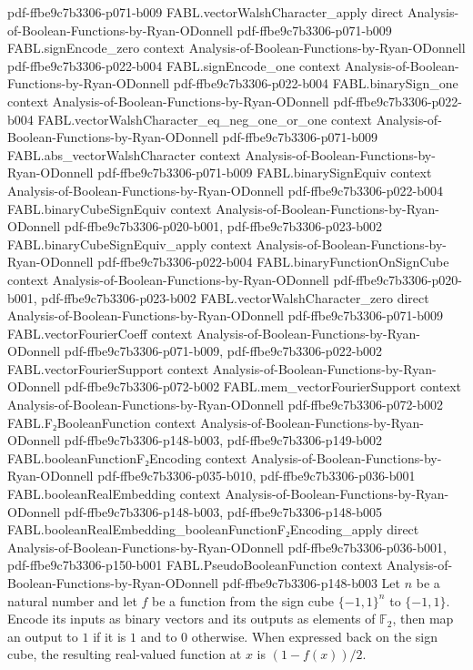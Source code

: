 \begin{theorem}
  {pdf-ffbe9c7b3306-p071-b009}
\proofstep
  {FABL.vectorWalshCharacter_apply}
  {direct}
  {Analysis-of-Boolean-Functions-by-Ryan-ODonnell}
  {pdf-ffbe9c7b3306-p071-b009}
\proofstep
  {FABL.signEncode_zero}
  {context}
  {Analysis-of-Boolean-Functions-by-Ryan-ODonnell}
  {pdf-ffbe9c7b3306-p022-b004}
\proofstep
  {FABL.signEncode_one}
  {context}
  {Analysis-of-Boolean-Functions-by-Ryan-ODonnell}
  {pdf-ffbe9c7b3306-p022-b004}
\proofstep
  {FABL.binarySign_one}
  {context}
  {Analysis-of-Boolean-Functions-by-Ryan-ODonnell}
  {pdf-ffbe9c7b3306-p022-b004}
\proofstep
  {FABL.vectorWalshCharacter_eq_neg_one_or_one}
  {context}
  {Analysis-of-Boolean-Functions-by-Ryan-ODonnell}
  {pdf-ffbe9c7b3306-p071-b009}
\proofstep
  {FABL.abs_vectorWalshCharacter}
  {context}
  {Analysis-of-Boolean-Functions-by-Ryan-ODonnell}
  {pdf-ffbe9c7b3306-p071-b009}
\proofstep
  {FABL.binarySignEquiv}
  {context}
  {Analysis-of-Boolean-Functions-by-Ryan-ODonnell}
  {pdf-ffbe9c7b3306-p022-b004}
\proofstep
  {FABL.binaryCubeSignEquiv}
  {context}
  {Analysis-of-Boolean-Functions-by-Ryan-ODonnell}
  {pdf-ffbe9c7b3306-p020-b001,
    pdf-ffbe9c7b3306-p023-b002}
\proofstep
  {FABL.binaryCubeSignEquiv_apply}
  {context}
  {Analysis-of-Boolean-Functions-by-Ryan-ODonnell}
  {pdf-ffbe9c7b3306-p022-b004}
\proofstep
  {FABL.binaryFunctionOnSignCube}
  {context}
  {Analysis-of-Boolean-Functions-by-Ryan-ODonnell}
  {pdf-ffbe9c7b3306-p020-b001,
    pdf-ffbe9c7b3306-p023-b002}
\proofstep
  {FABL.vectorWalshCharacter_zero}
  {direct}
  {Analysis-of-Boolean-Functions-by-Ryan-ODonnell}
  {pdf-ffbe9c7b3306-p071-b009}
\proofstep
  {FABL.vectorFourierCoeff}
  {context}
  {Analysis-of-Boolean-Functions-by-Ryan-ODonnell}
  {pdf-ffbe9c7b3306-p071-b009,
    pdf-ffbe9c7b3306-p022-b002}
\proofstep
  {FABL.vectorFourierSupport}
  {context}
  {Analysis-of-Boolean-Functions-by-Ryan-ODonnell}
  {pdf-ffbe9c7b3306-p072-b002}
\proofstep
  {FABL.mem_vectorFourierSupport}
  {context}
  {Analysis-of-Boolean-Functions-by-Ryan-ODonnell}
  {pdf-ffbe9c7b3306-p072-b002}
\proofstep
  {FABL.F₂BooleanFunction}
  {context}
  {Analysis-of-Boolean-Functions-by-Ryan-ODonnell}
  {pdf-ffbe9c7b3306-p148-b003,
    pdf-ffbe9c7b3306-p149-b002}
\proofstep
  {FABL.booleanFunctionF₂Encoding}
  {context}
  {Analysis-of-Boolean-Functions-by-Ryan-ODonnell}
  {pdf-ffbe9c7b3306-p035-b010,
    pdf-ffbe9c7b3306-p036-b001}
\proofstep
  {FABL.booleanRealEmbedding}
  {context}
  {Analysis-of-Boolean-Functions-by-Ryan-ODonnell}
  {pdf-ffbe9c7b3306-p148-b003,
    pdf-ffbe9c7b3306-p148-b005}
\proofstep
  {FABL.booleanRealEmbedding_booleanFunctionF₂Encoding_apply}
  {direct}
  {Analysis-of-Boolean-Functions-by-Ryan-ODonnell}
  {pdf-ffbe9c7b3306-p036-b001,
    pdf-ffbe9c7b3306-p150-b001}
\proofstep
  {FABL.PseudoBooleanFunction}
  {context}
  {Analysis-of-Boolean-Functions-by-Ryan-ODonnell}
  {pdf-ffbe9c7b3306-p148-b003}
Let $n$ be a natural number and let $f$ be a function from the sign cube $\{-1,1\}^n$
to $\{-1,1\}$. Encode its inputs as binary vectors and its outputs as elements of
$\mathbb{F}_2$, then map an output to $1$ if it is $1$ and to $0$ otherwise. When
expressed back on the sign cube, the resulting real-valued function at $x$ is
$(1-f(x))/2$.
\end{theorem}
